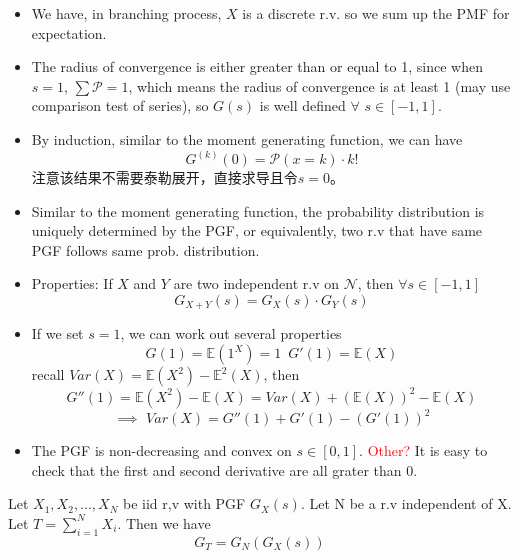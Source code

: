 \documentclass[10.5pt]{article}
\newcommand{\prob}[0]{\mathcal{P}}
\newcommand{\expt}[0]{\mathbb{E}}
\newenvironment{changemargin}[2]{%
  \begin{list}{}{%
    \setlength{\topsep}{0pt}%
    \setlength{\leftmargin}{#1}%
    \setlength{\rightmargin}{#2}%
    \setlength{\listparindent}{\parindent}%
    \setlength{\itemindent}{\parindent}%
    \setlength{\parsep}{\parskip}%
  }%
  \item[]}{\end{list}}
\begin{document}
\begin{changemargin}{-0.125in}{0in}
\begin{enumerate}
            \begin{itemize}
            	\item  We have, in branching process, $X$ is a discrete r.v. so we sum up the PMF for expectation. 
            	\item The radius of convergence is either greater than or equal to 1, since when $s = 1$, $\sum \prob = 1$, which means the radius of convergence is at least 1 (may use comparison test of series), so $G(s)$ is well defined $\forall\,\,s \in [-1,1]$. 
            	\item By induction, similar to the moment generating function, we can have 
            	       \[
            	       G^{(k)}(0) = \prob(x = k)\cdot k!
                       \]
                       注意该结果不需要泰勒展开，直接求导且令$s = 0$。
                \item Similar to the moment generating function, the probability distribution is uniquely determined by the PGF, or equivalently, two r.v that have same PGF follows same prob. distribution. 
                \item Properties: If $X$ and $Y$ are two independent r.v on $\mathcal{N}$, then $\forall s \in [-1,1]$
                        \[
                        G_{X+Y}(s) = G_X(s)\cdot G_Y(s)
                        \]
                 \item If we set $s = 1$, we can work out several properties
                       \[
                       G(1) = \expt(1^X) = 1\,\,\,G'(1) = \expt(X)
                       \]
                       recall $Var(X) = \expt(X^2) - \expt^2(X)$, then
                       \[
                       G''(1) = \expt(X^2) - \expt(X) = Var(X) + (\expt(X))^2 - \expt(X) 
                       \]
                       \[
                       \implies \,\, Var(X) = G''(1) + G'(1) - (G'(1))^2
                       \]
                  \item The PGF is non-decreasing and convex on $s \in [0,1]$. \textcolor{red}{Other?} It is easy to check that the first and second derivative are all grater than 0.
            \end{itemize}
            
            \medskip
             
            \begin{proposition}
            	Let $X_1, X_2, ..., X_N$ be iid r,v with PGF $G_X(s)$. Let N be a r.v independent of X. Let $T = \sum^N_{i=1} X_i$. Then we have 
            	\[
            	G_T = G_N(G_X(s))
            	\]
            \end{proposition}
            

\end{enumerate}
\end{changemargin}
\end{document}
